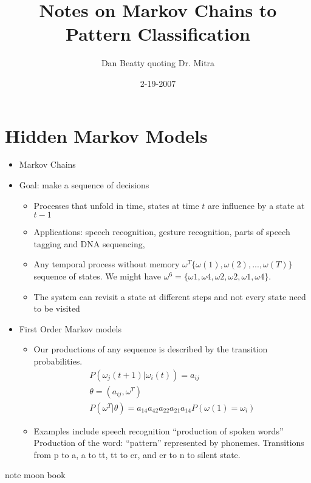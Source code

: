 \documentclass[11pt]{article}
\title{Notes on Markov Chains to Pattern Classification}
\author{Dan Beatty quoting Dr. Mitra}
\date{2-19-2007}                                           %
\begin{document}
\maketitle


\section{Hidden Markov Models}

\begin{itemize}
	\item Markov Chains
	\item Goal: make a sequence of decisions
	\begin{itemize}
		\item Processes that unfold in time, states at time $t$ are influence by a state at $t-1$
		\item Applications: speech recognition, gesture recognition, parts of speech tagging and DNA sequencing, 
		\item Any temporal process without memory $\omega ^T \{ \omega(1),\omega(2), ..., \omega(T) \}$ sequence of states.  We might have $\omega^6 = \{ \omega 1, \omega 4, \omega 2, \omega 2, \omega 1, \omega 4  \}$.
		\item The system can revisit a state at different steps and not every state need to be visited 
	\end{itemize}
	\item First Order Markov models
	\begin{itemize}
		\item Our productions of any sequence is described by the transition probabilities. 
		\begin{eqnarray}
			P( \omega_j (t+1) | \omega_i (t)) = a_{ij} \\
			\theta = ( a_ {ij} , \omega^T) \\
			P(\omega^T | \theta) = a_{14} a_{42} a_{22} a_{21} a_{14} P(\omega(1) = \omega_i)
		\end{eqnarray}
		\item Examples include speech recognition
		``production of spoken words''  Production of the word: ``pattern'' represented by phonemes.
		Transitions from p to a, a to tt, tt to er, and er to n to silent state.  
	\end{itemize}
	
\end{itemize}


note moon book
\end{document}

